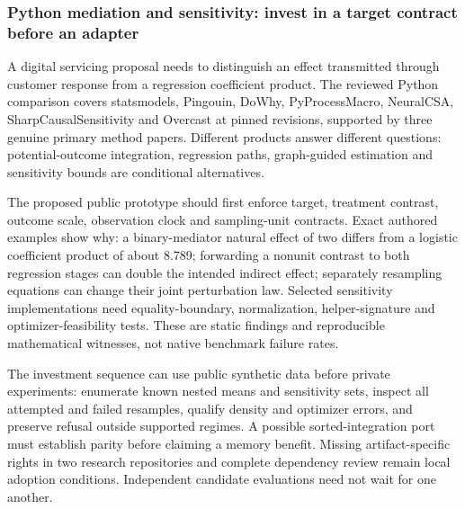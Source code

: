 \hypertarget{python-mediation-and-sensitivity-invest-in-a-target-contract-before-an-adapter}{%
\subsubsection{Python mediation and sensitivity: invest in a target
contract before an
adapter}\label{python-mediation-and-sensitivity-invest-in-a-target-contract-before-an-adapter}}

A digital servicing proposal needs to distinguish an effect transmitted
through customer response from a regression coefficient product. The
reviewed Python comparison covers statsmodels, Pingouin, DoWhy,
PyProcessMacro, NeuralCSA, SharpCausalSensitivity and Overcast at pinned
revisions, supported by three genuine primary method papers. Different
products answer different questions: potential-outcome integration,
regression paths, graph-guided estimation and sensitivity bounds are
conditional alternatives.
\citep{exec25_pymed_statsmodels,exec25_pymed_pingouin,exec25_pymed_dowhy,exec25_pymed_process,exec25_pymed_neuralcsa,exec25_pymed_sharp,exec25_pymed_overcast,exec25_pymed_neural_paper,exec25_pymed_sharp_paper,exec25_pymed_overcast_paper}

The proposed public prototype should first enforce target, treatment
contrast, outcome scale, observation clock and sampling-unit contracts.
Exact authored examples show why: a binary-mediator natural effect of
two differs from a logistic coefficient product of about 8.789;
forwarding a nonunit contrast to both regression stages can double the
intended indirect effect; separately resampling equations can change
their joint perturbation law. Selected sensitivity implementations need
equality-boundary, normalization, helper-signature and
optimizer-feasibility tests. These are static findings and reproducible
mathematical witnesses, not native benchmark failure rates.
\citep{exec25_pymed_choice}

The investment sequence can use public synthetic data before private
experiments: enumerate known nested means and sensitivity sets, inspect
all attempted and failed resamples, qualify density and optimizer
errors, and preserve refusal outside supported regimes. A possible
sorted-integration port must establish parity before claiming a memory
benefit. Missing artifact-specific rights in two research repositories
and complete dependency review remain local adoption conditions.
Independent candidate evaluations need not wait for one another.
\citep{exec25_pymed_choice}

